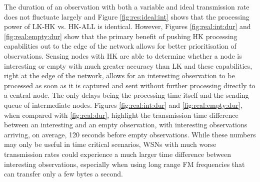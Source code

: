 The duration of an observation with both a variable and ideal transmission rate does not fluctuate largely and Figure \ref{fig:res:ideal:int} shows that the processing power of LK-HK vs. HK-ALL is identical. However, Figures \ref{fig:real:int:dur} and \ref{fig:real:empty:dur} show that the primary benefit of pushing HK processing capabilities out to the edge of the network allows for better prioritisation of observations. Sensing nodes with HK are able to determine whether a node is interesting or empty with much greater accuracy than LK and these capabilities, right at the edge of the network, allows for an interesting observation to be processed as soon as it is captured and sent without further processing directly to a central node. The only delays being the processing time itself and the sending queue of intermediate nodes. Figures \ref{fig:real:int:dur} and \ref{fig:real:empty:dur}, when compared with \ref{fig:real:dur}, highlight the transmission time difference between an interesting and an empty observation, with interesting observations arriving, on average, 120 seconds before empty observations. While these numbers may only be useful in time critical scenarios, WSNs with much worse transmission rates could experience a much larger time difference between interesting observations, especially when using long range FM frequencies that can transfer only a few bytes a second.
